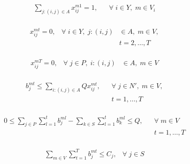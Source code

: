 \documentclass[conference]{IEEEtran}
\begin{document}
\begin{equation}
    \begin{split}
        \sum_{j:(i, j) \in A}x_{ij}^{m1} = 1, \;\;\; & \forall \; i \in Y, \; m \in V_{i}\\\label{eq6}
    \end{split}
\end{equation}

\begin{equation}
    \begin{split}
        x_{ij}^{mt} = 0, \;\;\;\forall\; i \in Y,\; j:(i, j)& \in A,\; m \in V,\\& t=2, \dots, T\\\label{eq7}
    \end{split}
\end{equation}

\begin{equation}
    \begin{split}
        x_{ij}^{mT} = 0, \;\;\;\forall\; j \in P,\; i:(i, j)& \in A,\; m \in V\\\label{eq8}
    \end{split}
\end{equation}

\begin{equation}
    \begin{split}
        b_{j}^{mt} \leq \sum_{i:(i, j) \in A} Qx_{ij}^{mt}, \;\;\; &\forall \; j \in N', \;m \in V, \\& t=1, \dots, T\\\label{eq9}
    \end{split}
\end{equation}

\begin{equation}
    \begin{split}
        0 \leq \sum_{j\in P}\sum_{l=1}^{t}b_{j}^{ml} - \sum_{k\in S}\sum_{l=1}^{t}b_{k}^{ml} \leq Q,\;\;\; &\forall\; m \in V\\
        &t=1, \dots, T\\\label{eq10}
    \end{split}
\end{equation}

\begin{equation}
    \begin{split}
        \sum_{m \in V}\sum_{t=1}^{T}b_{j}^{mt} \leq C_{j}, \;\;\; \forall \; j \in S\\\label{eq11}
    \end{split}
\end{equation}
\end{document}

